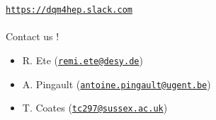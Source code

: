 \documentclass[presentation, 10pt]{beamer}
\begin{document}
\begin{frame}
\begin{minipage}{0.035\linewidth}
  \end{minipage}
  \href{https://dqm4hep.slack.com}{\tt https://dqm4hep.slack.com} \\
  ~\\
  Contact us !
  \begin{itemize}
    \item R. Ete (\href{mailto:remi.ete@desy.de}{\tt remi.ete@desy.de})
    \item A. Pingault (\href{mailto:antoine.pingault@ugent.be}{\tt antoine.pingault@ugent.be})
    \item T. Coates (\href{mailto:tc297@sussex.ac.uk}{\tt tc297@sussex.ac.uk})
  \end{itemize}
\end{frame}
\end{document}

